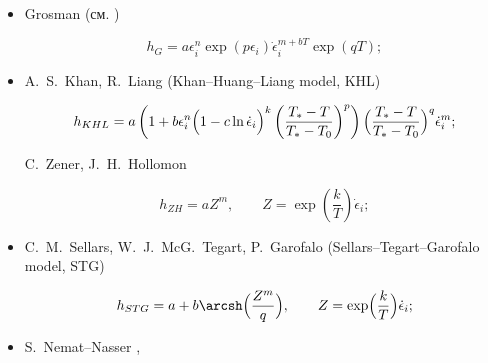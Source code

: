 \begin{itemize}
\item[--] 

Grosman (см. \cite{keller:bib:tong})

\begin{equation}

	h_G=a\epsilon_i^{n}\exp(p\epsilon_i)\dot{\epsilon}_i^{m+bT}\exp(qT);

\end{equation}



\item[--] 

A.~S.~Khan, R.~Liang  (Khan–Huang–Liang model, KHL) \cite{keller:bib:khan2011, keller:bib:KHL-1, keller:bib:KHL-2, keller:bib:KHL-3}  

\begin{equation}

	h_{KHL}= a\left(1

	+ b\epsilon_i^{n}\Bigl(1-c\ln\dot{\epsilon}_i\Bigr)^{k}\left(\frac{T_{\ast}-T}{T_{\ast}-T_0}\right)^{p}\right)

	\Bigl(\frac{T_{\ast}-T}{T_{\ast}-T_0}\Bigr)^{q}\dot{\epsilon}_i^{m};

\end{equation}



C.~Zener, J.~H.~Hollomon \cite{keller:bib:tong, keller:bib:Zener-Holomon}

\begin{equation}

	h_{ZH}=aZ^m,\qquad Z=\exp\left(\frac{k}{T}\right)\dot{\epsilon}_i;

\end{equation}





\item[--]

C.~M.~Sellars, W.~J.~McG.~Tegart,  P.~Garofalo (Sellars--Tegart--Garofalo model, STG) \cite{keller:bib:soft}

\begin{equation}

	h_{STG}=a+b\arcsh\Bigl(\frac{Z^m}{q}\Bigr),\qquad Z=\exp\Bigl(\frac{k}{T}\Bigr)\dot{\epsilon}_i;

\end{equation}



\item[--]

S.~Nemat--Nasser \cite[p.~65]{keller:bib:hu}, \cite{keller:bib:Nemat-Nasser}


\end{itemize}
